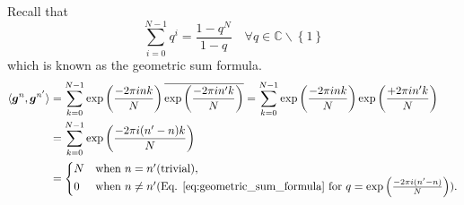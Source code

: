 \begin{Proof}\label{proof:1ddft_vectors_orthononality}
    Recall that
    \begin{equation}\label{eq:geometric_sum_formula}
        \sum_{i=0}^{N-1} q^i = \frac{1-q^N}{1-q} \quad \forall q \in \mathbb{C}\backslash\left\{1\right\}
    \end{equation}
    which is known as the geometric sum formula. 
    \begin{equation}
    \begin{split} 
        \langle\boldsymbol{g}^n,\boldsymbol{g}^{n'}\rangle &= \sum_{k=0}^{N-1} \exp\left({\frac{-2\pi ink}{N}}\right)\overline{\exp\left({\frac{-2\pi in'k}{N}}\right)}
        = \sum_{k=0}^{N-1} \exp\left({\frac{-2\pi ink}{N}}\right)\exp\left({\frac{+2\pi in'k}{N}}\right)\\
        &= \sum_{k=0}^{N-1} \exp\left({\frac{-2\pi i(n'-n)k}{N}}\right)\\
        &=
        \begin{cases}
            N & \text{when $n = n'$}\text{(trivial)},\\
            0 & \text{when $n\neq n'$}\text{(Eq. \ref{eq:geometric_sum_formula} for $q = \exp\left({\frac{-2\pi i(n'-n)}{N}}\right)$)}.
        \end{cases}
    \end{split}
\end{equation}
\end{Proof}

